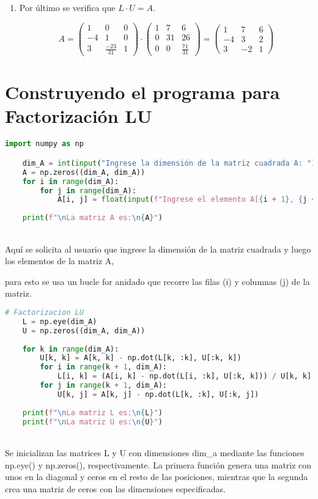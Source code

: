 \documentclass[letterpaper,12pt]{article}
\begin{document}
\begin{enumerate}
    
    \item Por último se verifica que  $L\cdot U = A$.

\[
A = \begin{pmatrix}
    1 & 0 & 0 \\
    -4 & 1 & 0 \\
    3 & \frac{-23}{31} & 1
    \end{pmatrix}
    \cdot
    \begin{pmatrix}
    1 & 7 & 6 \\
    0 & 31 & 26 \\
    0 & 0 & \frac{71}{31}
    \end{pmatrix}
    =
    \begin{pmatrix}
    1 & 7 & 6 \\
    -4 & 3 & 2 \\
    3 & -2 & 1
    \end{pmatrix}
\]
    
\end{enumerate}

\section*{Construyendo el programa para Factorización LU}
\begin{lstlisting}[style=jupyter, language=Python, caption={Construyendo la Matriz A}]
    import numpy as np

    dim_A = int(input("Ingrese la dimensión de la matriz cuadrada A: "))
    A = np.zeros((dim_A, dim_A))
    for i in range(dim_A):
        for j in range(dim_A):
            A[i, j] = float(input(f"Ingrese el elemento A[{i + 1}, {j + 1}]: "))
    
    print(f"\nLa matriz A es:\n{A}")
\end{lstlisting}
\\
Aquí se solicita al usuario que ingrese la dimensión de la matriz cuadrada y luego los elementos de la matriz A, 

para esto se usa un bucle for anidado que recorre las filas (i) y columnas (j) de la matriz.
\\
\begin{lstlisting}[style=jupyter, language=Python, caption={Factorizando}]
    # Factorizacion LU
    L = np.eye(dim_A)
    U = np.zeros((dim_A, dim_A))
    
    for k in range(dim_A):
        U[k, k] = A[k, k] - np.dot(L[k, :k], U[:k, k])
        for i in range(k + 1, dim_A):
            L[i, k] = (A[i, k] - np.dot(L[i, :k], U[:k, k])) / U[k, k]
        for j in range(k + 1, dim_A):
            U[k, j] = A[k, j] - np.dot(L[k, :k], U[:k, j])
    
    print(f"\nLa matriz L es:\n{L}")
    print(f"\nLa matriz U es:\n{U}")
\end{lstlisting}
\\
Se inicializan las matrices L y U con dimensiones \textcolor{jl_keyword}{dim\_a} mediante las funciones \textcolor{jl_keyword}{np.eye()} y \textcolor{jl_keyword}{np.zeros()}, respectivamente. La primera función genera una matriz con unos en la diagonal y ceros en el resto de las posiciones, mientras que la segunda crea una matriz de ceros con las dimensiones especificadas.
\end{document}
